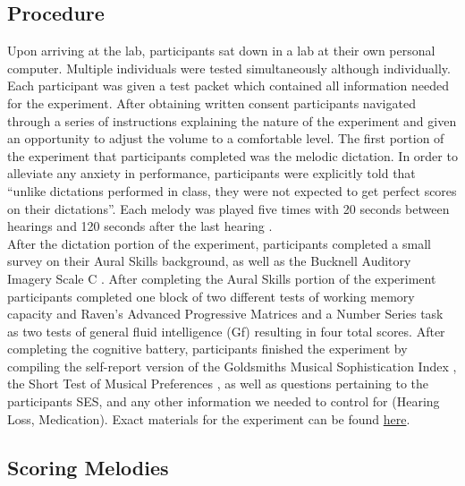\documentclass[]{book}
\begin{document}
\hypertarget{procedure-1}{%
\subsection{Procedure}\label{procedure-1}}

Upon arriving at the lab, participants sat down in a lab at their own personal computer.
Multiple individuals were tested simultaneously although individually.
Each participant was given a test packet which contained all information needed for the experiment.
After obtaining written consent participants navigated through a series of instructions explaining the nature of the experiment and given an opportunity to adjust the volume to a comfortable level.
The first portion of the experiment that participants completed was the melodic dictation.
In order to alleviate any anxiety in performance, participants were explicitly told that ``unlike dictations performed in class, they were not expected to get perfect scores on their dictations''.
Each melody was played five times with 20 seconds between hearings and 120 seconds after the last hearing \citep{paneyEffectDirectingAttention2016}.\\
After the dictation portion of the experiment, participants completed a small survey on their Aural Skills background, as well as the Bucknell Auditory Imagery Scale C \citep{halpernDifferencesAuditoryImagery2015}.
After completing the Aural Skills portion of the experiment participants completed one block of two different tests of working memory capacity \citep{unsworthAutomatedVersionOperation2005} and Raven's Advanced Progressive Matrices and a Number Series task as two tests of general fluid intelligence (Gf) \citep{ravenManualRavenProgressive1994, thurstonePrimaryMentalAbilities1938} resulting in four total scores.
After completing the cognitive battery, participants finished the experiment by compiling the self-report version of the Goldsmiths Musical Sophistication Index \citep{mullensiefenMusicalityNonMusiciansIndex2014}, the Short Test of Musical Preferences \citep{rentfrowReMiEveryday2003}, as well as questions pertaining to the participants SES, and any other information we needed to control for (Hearing Loss, Medication). Exact materials for the experiment can be found \href{https://github.com/davidjohnbaker1/modelingMelodicDictation}{here}.

\hypertarget{scoring-melodies}{%
\subsection{Scoring Melodies}\label{scoring-melodies}}
\end{document}
